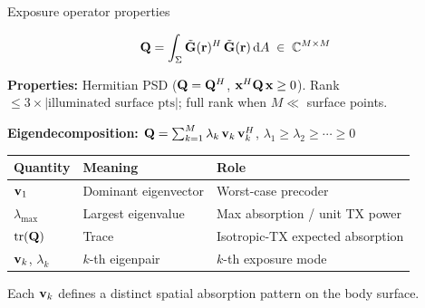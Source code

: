 \begin{frame}[label=app-p3-Q-props]{Exposure operator properties}

  \begin{resultbox}
    \vspace{-4pt}
    \[
      \mathbf{Q} = \int_\Sigma \tilde{\mathbf{G}}(\mathbf{r})^H\,\tilde{\mathbf{G}}(\mathbf{r})\,\mathrm{d} A
      \;\in\; \mathbb{C}^{M \times M}
    \]
  \end{resultbox}

  \vspace{2pt}
  \textbf{Properties:}
  Hermitian PSD ($\mathbf{Q} = \mathbf{Q}^H$, $\mathbf{x}^H\mathbf{Q}\,\mathbf{x} \ge 0$).
  Rank $\le 3 \times |\text{illuminated surface pts}|$; full rank when $M \ll$ surface points.

  \vspace{2pt}
  \textbf{Eigendecomposition:} $\mathbf{Q} = \sum_{k=1}^{M} \lambda_k\,\mathbf{v}_k\,\mathbf{v}_k^H$, \quad $\lambda_1 \ge \lambda_2 \ge \cdots \ge 0$

  \vspace{2pt}
  {\small
  \begin{tabular}{lll}
    \toprule
    Quantity & Meaning & Role \\
    \midrule
    $\mathbf{v}_1$ & Dominant eigenvector & Worst-case precoder \\
    $\lambda_{\max}$ & Largest eigenvalue & Max absorption / unit TX power \\
    $\operatorname{tr}(\mathbf{Q})$ & Trace & Isotropic-TX expected absorption \\
    $\mathbf{v}_k$, $\lambda_k$ & $k$-th eigenpair & $k$-th exposure mode \\
    \bottomrule
  \end{tabular}
  }

  \vspace{0pt}
  {\footnotesize Each $\mathbf{v}_k$ defines a distinct spatial absorption pattern on the body surface.}
  \vspace{-4pt}
\end{frame}

